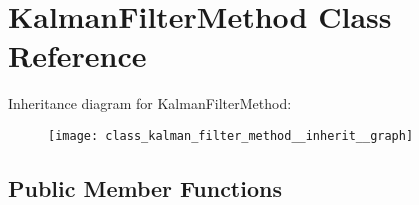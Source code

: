 \hypertarget{class_kalman_filter_method}{\section{\-Kalman\-Filter\-Method \-Class \-Reference}
\label{class_kalman_filter_method}
}


\-Inheritance diagram for \-Kalman\-Filter\-Method\-:
\nopagebreak
\begin{figure}[H]
\begin{center}
\leavevmode
\texttt{[image: class\_kalman\_filter\_method\_\_inherit\_\_graph]}
\end{center}
\end{figure}
\subsection*{\-Public \-Member \-Functions}
